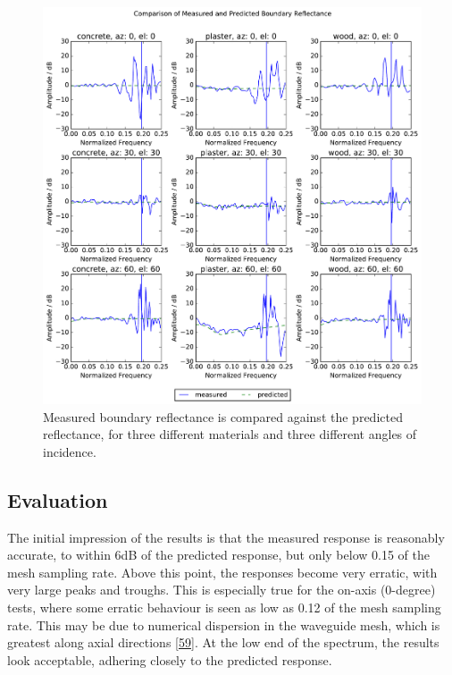 \documentclass[]{scrreprt}
\begin{document}
\begin{figure}[htbp]
\centering
\includegraphics{images/reflectance.pdf}
\caption{Measured boundary reflectance is compared against the predicted
reflectance, for three different materials and three different angles of
incidence.\label{fig:reflectance}}
\end{figure}

\subsection{Evaluation}\label{evaluation}

The initial impression of the results is that the measured response is
reasonably accurate, to within 6dB of the predicted response, but only
below 0.15 of the mesh sampling rate. Above this point, the responses
become very erratic, with very large peaks and troughs. This is
especially true for the on-axis (0-degree) tests, where some erratic
behaviour is seen as low as 0.12 of the mesh sampling rate. This may be
due to numerical dispersion in the waveguide mesh, which is greatest
along axial directions
{[}\protect\hyperlink{ref-kowalczykux5fmodelingux5f2008}{59}{]}. At the
low end of the spectrum, the results look acceptable, adhering closely
to the predicted response.
\end{document}
